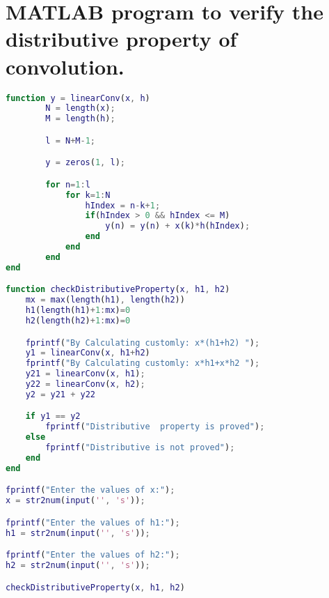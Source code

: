 \documentclass{article}
\begin{document}
\section{MATLAB program to verify the distributive property of convolution.}
\begin{lstlisting}[language=matlab, caption=MATLAB program to verify the distributive property of convolution]
function y = linearConv(x, h)
        N = length(x);
        M = length(h);

        l = N+M-1;

        y = zeros(1, l);

        for n=1:l
            for k=1:N
                hIndex = n-k+1;
                if(hIndex > 0 && hIndex <= M)
                    y(n) = y(n) + x(k)*h(hIndex);
                end
            end
        end
end

function checkDistributiveProperty(x, h1, h2)
    mx = max(length(h1), length(h2))
    h1(length(h1)+1:mx)=0
    h2(length(h2)+1:mx)=0

    fprintf("By Calculating customly: x*(h1+h2) ");
    y1 = linearConv(x, h1+h2)
    fprintf("By Calculating customly: x*h1+x*h2 ");
    y21 = linearConv(x, h1);
    y22 = linearConv(x, h2);
    y2 = y21 + y22

    if y1 == y2
        fprintf("Distributive  property is proved");
    else
        fprintf("Distributive is not proved");
    end
end

fprintf("Enter the values of x:");
x = str2num(input('', 's'));

fprintf("Enter the values of h1:");
h1 = str2num(input('', 's'));

fprintf("Enter the values of h2:");
h2 = str2num(input('', 's'));

checkDistributiveProperty(x, h1, h2)
\end{lstlisting}
\end{document}
